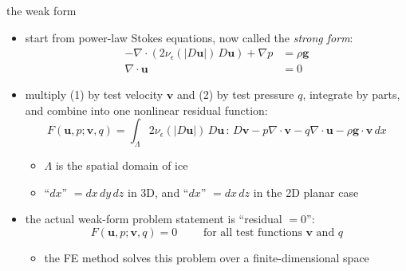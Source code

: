 \documentclass[10pt,
               hyperref={colorlinks,citecolor=DeepPink4,linkcolor=black,urlcolor=blue},
               svgnames]{beamer}
\newcommand{\bv}{\mathbf{v}}
\newcommand{\bu}{\mathbf{u}}
\newcommand{\Div}{\nabla\cdot}
\newcommand{\eps}{\epsilon}
\begin{document}
\begin{frame}{the weak form}

\begin{itemize}
\item start from power-law Stokes equations, now called the \emph{strong form}:
\begin{align}
- \nabla \cdot \left(2 \nu_\eps(|D\bu|)\, D\bu\right) + \nabla p &= \rho \mathbf{g} \\
\Div \bu &= 0
\end{align}
\item multiply (1) by test velocity $\bv$ and (2) by test pressure $q$, integrate by parts, and combine into one \alert{nonlinear residual function}:
    $$F(\bu,p;\bv,q) = \int_{\Lambda} 2 \nu_\eps(|D\bu|)\, D\bu\,:\,D\bv - p \nabla \cdot \bv - q \nabla \cdot \bu - \rho \mathbf{g} \cdot \bv \,dx$$

    \begin{itemize}
    \item[$\circ$] $\Lambda$ is the spatial domain of ice
    \item[$\circ$] ``$dx$'' $=dx\,dy\,dz$ in 3D, and ``$dx$'' $=dx\,dz$ in the 2D planar case
    \end{itemize}

\medskip
\item the actual \alert{weak-form problem statement} is ``residual $=0$'':
   $$F(\bu,p;\bv,q) = 0 \qquad \text{ for all test functions } \bv \text{ and } q$$

    \begin{itemize}
    \item[$\circ$] the FE method solves this problem over a finite-dimensional space
    \end{itemize}
\end{itemize}
\end{frame}
\end{document}
